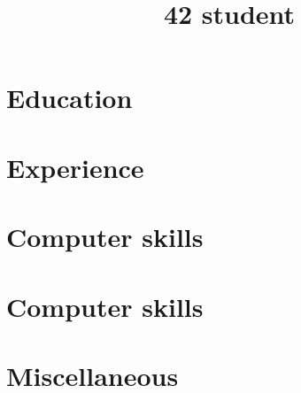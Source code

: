 \documentclass[11pt,a4paper]{moderncv}
\title{42 student}
\begin{document}
\makecvtitle
\section{Education}
\section{Experience}
\section{Computer skills}
\section{Computer skills}
\section{Miscellaneous}
\end{document}
